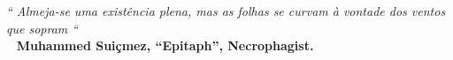 \def\textoEpigrafe{
  Almeja-se uma existência plena, mas as folhas se curvam à vontade dos ventos que sopram
}

\def\autorEpigrafe{Muhammed Suiçmez, “Epitaph”, Necrophagist.}

\begin{epigrafe}
  \vspace*{\fill}
  \hfill{}
  \parbox{6cm}{
    \begin{flushright}
      \textit{``\textoEpigrafe``}\\
      \bigbreak\
      \textbf{\autorEpigrafe}

    \end{flushright}
  }
\end{epigrafe}